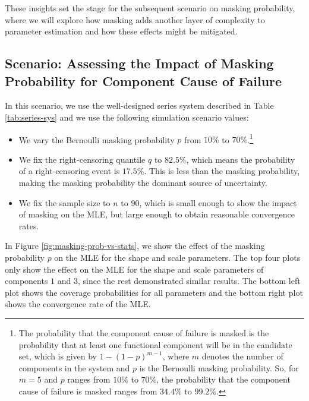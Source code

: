 \documentclass[
]{article}
\providecommand{\tightlist}{%
  \setlength{\itemsep}{0pt}\setlength{\parskip}{0pt}}
\theoremstyle{definition}
\theoremstyle{plain}
\theoremstyle{definition}
\theoremstyle{definition}
\theoremstyle{definition}
\theoremstyle{definition}
\theoremstyle{remark}
\begin{document}
These insights set the stage for the subsequent scenario on masking probability,
where we will explore how masking adds another layer of complexity to parameter
estimation and how these effects might be mitigated.

\hypertarget{p-vs-mttf}{%
\subsection{Scenario: Assessing the Impact of Masking Probability for Component Cause of Failure}\label{p-vs-mttf}}

In this scenario, we use the well-designed series system described in Table \ref{tab:series-sys}
and we use the following simulation scenario values:

\begin{itemize}
\tightlist
\item
  We vary the Bernoulli masking probability \(p\) from \(10\%\) to \(70\%\).\footnote{The probability that the component cause of failure is masked is the
    probability that at least one functional component will be in the
    candidate set, which is given by \(1 - (1 - p)^{m-1}\), where \(m\) denotes the number
    of components in the system and \(p\) is the Bernoulli masking probability. So, for
    \(m = 5\) and \(p\) ranges from \(10\%\) to \(70\%\), the probability that the component cause of
    failure is masked ranges from \(34.4\%\) to \(99.2\%\).}
\item
  We fix the right-censoring quantile \(q\) to \(82.5\%\), which means the probability
  of a right-censoring event is \(17.5\%\). This is less than the masking probability,
  making the masking probability the dominant source of uncertainty.
\item
  We fix the sample size to \(n\) to \(90\), which is small enough to show the impact of
  masking on the MLE, but large enough to obtain reasonable convergence rates.
\end{itemize}

In Figure \ref{fig:masking-prob-vs-stats}, we show the effect of the masking
probability \(p\) on the MLE for the shape and scale parameters. The top four
plots only show the effect on the MLE for the shape and scale parameters of
components \(1\) and \(3\), since the rest demonstrated similar results. The bottom
left plot shows the coverage probabilities for all parameters and the bottom
right plot shows the convergence rate of the MLE.
\end{document}
